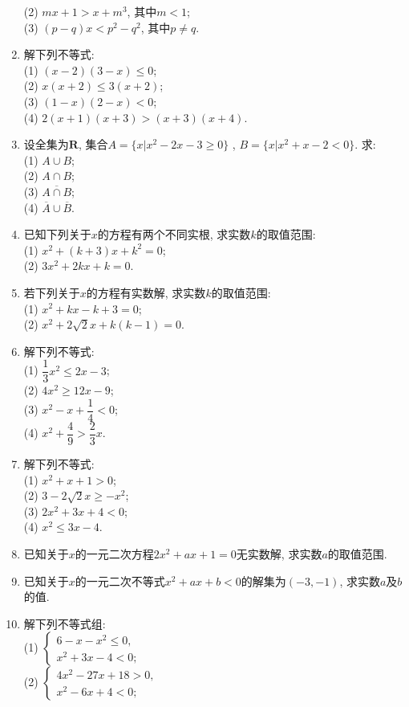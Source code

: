 \documentclass[10pt,a4paper]{article}
\begin{document}
\begin{enumerate}[1.]
(2) $mx+1>x+m^3$, 其中$m<1$;\\
(3) $(p-q)x<p^2-q^2$, 其中$p\ne q$.
\item 解下列不等式:\\
(1) $(x-2)(3-x)\le 0$;\\
(2) $x(x+2)\le 3(x+2)$;\\
(3) $(1-x)(2-x)<0$;\\
(4) $2(x+1)(x+3)>(x+3)(x+4)$.
\item 设全集为$\mathbf{R}$, 集合$A=\{x|x^2-2x-3\ge 0\}$
, $B=\{x|x^2+x-2<0\}$. 求:\\
(1) $A\cup B$;\\
(2) $A\cap B$;\\
(3) $\overline{A\cap B}$;\\
(4) $\overline A\cup \overline B$.
\item 已知下列关于$x$的方程有两个不同实根, 求实数$k$的取值范围:\\
(1) $x^2+(k+3)x+k^2=0$;\\
(2) $3x^2+2kx+k=0$.
\item 若下列关于$x$的方程有实数解, 求实数$k$的取值范围:\\
(1) $x^2+kx-k+3=0$;\\
(2) $x^2+2\sqrt 2x+k(k-1)=0$.
\item 解下列不等式:\\
(1) $\dfrac 13x^2\le 2x-3$;\\
(2) $4x^2\ge 12x-9$;\\
(3) $x^2-x+\dfrac 14<0$;\\
(4) $x^2+\dfrac 49>\dfrac 23x$.
\item 解下列不等式:\\
(1) $x^2+x+1>0$;\\
(2) $3-2\sqrt 2x\ge -x^2$;\\
(3) $2x^2+3x+4<0$;\\
(4) $x^2\le 3x-4$.
\item 已知关于$x$的一元二次方程$2x^2+ax+1=0$无实数解, 求实数$a$的取值范围.
\item 已知关于$x$的一元二次不等式$x^2+ax+b<0$的解集为$(-3, -1)$, 求实数$a$及$b$的值. 
\item 解下列不等式组:\\
(1) $\begin{cases} 6-x-x^2\le 0, \\ x^2+3x-4<0; \end{cases}$\\
(2) $\begin{cases} 4x^2-27x+18>0,\\ x^2-6x+4<0; \end{cases}$\\

\end{enumerate}
\end{document}
